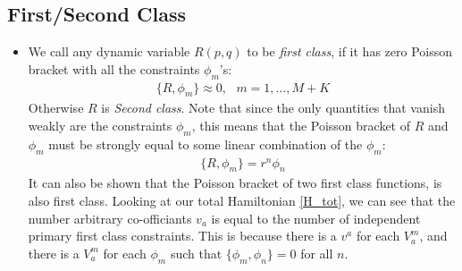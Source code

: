 \documentclass[11pt]{article}
\numberwithin{equation}{section}
\begin{document}
\subsection{First/Second Class} %
\label{sub:first_second_class_variables}
\begin{itemize}
  \item We call any dynamic variable $R(p,q)$ to be \emph{first class}, if it has zero Poisson bracket with all the constraints $\phi_m$'s:
 \begin{align*}
       \{R,\phi_m\} \approx 0,~~~m=1,\ldots,M+K
     \end{align*}    
     Otherwise $R$ is \emph{Second class}. Note that since the only quantities that vanish weakly are the constraints $\phi_m$, this means that the Poisson bracket of $R$ and $\phi_m$ must be strongly equal to some linear combination of the $\phi_m$:
     \begin{align*}
        \{R,\phi_m\}  = r^n\phi_n
     \end{align*}
     It can also be shown that the Poisson bracket of two first class functions, is also first class. Looking at our total Hamiltonian \ref{H_tot}, we can see that the number arbitrary co-officiants $v_a$ is equal to the number of independent primary first class constraints. This is because there is a $v^a$ for each $V^m_a$, and there is a $V^m_a$ for each $\phi_m$ such that $\{\phi_m,\phi_n\}=0$ for all $n$. 
\end{itemize}
\end{document}
